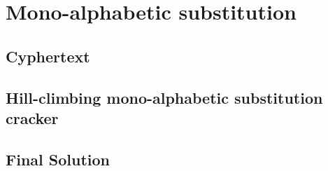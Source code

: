 \documentclass[pdftex, 11pt, a4paper]{article}
\begin{document}
\section{Mono-alphabetic substitution}
\subsection{Cyphertext}\label{q3-cyphertext}

\subsection{Hill-climbing mono-alphabetic substitution cracker}\label{break-simplesub}

\pagebreak

\subsection{Final Solution}\label{q3-solution}
\pagebreak
\end{document}
